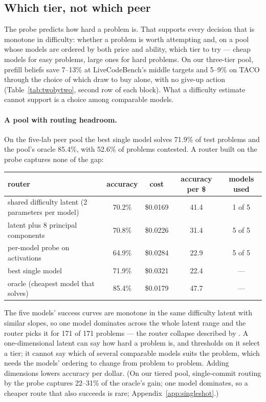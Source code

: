 \documentclass[10pt]{article} %
\begin{document}
\subsection{Which tier, not which peer}
\label{sec:whethernotwhich}

The probe predicts how hard a problem is.  That supports every decision that is monotone in
difficulty: whether a problem is worth attempting and, on a pool whose models are ordered by both
price and ability, which tier to try --- cheap models for easy problems, large ones for hard
problems.  On our three-tier pool, prefill beliefs save 7--13\% at LiveCodeBench's middle targets
and 5--9\% on TACO through the choice of which draw to buy alone, with no give-up action
(Table~\ref{tab:twobytwo}, second row of each block).  What a difficulty estimate cannot support
is a choice among comparable models.

\paragraph{A pool with routing headroom.}
On the five-lab peer pool the best single model solves 71.9\% of test problems and the pool's
oracle 85.4\%, with 52.6\% of problems contested.  A router built on the probe captures none of
the gap:
\begin{center}
\small
\begin{tabular}{lcccc}
\toprule
router & accuracy & cost & accuracy per \$ & models used \\
\midrule
shared difficulty latent (2 parameters per model) & 70.2\% & \$0.0169 & 41.4 & 1 of 5 \\
latent plus 8 principal components & 70.8\% & \$0.0226 & 31.4 & 5 of 5 \\
per-model probe on activations & 64.9\% & \$0.0284 & 22.9 & 5 of 5 \\
best single model & 71.9\% & \$0.0321 & 22.4 & --- \\
oracle (cheapest model that solves) & 85.4\% & \$0.0179 & 47.7 & --- \\
\bottomrule
\end{tabular}
\end{center}
The five models' success curves are monotone in the same difficulty latent with similar slopes,
so one model dominates across the whole latent range and the router picks it for 171 of 171
problems --- the router collapse described by \citet{routingcollapse2026}.  A one-dimensional
latent can say how hard a problem is, and thresholds on it select a tier; it cannot say which of
several comparable models suits the problem, which needs the models' ordering to change from
problem to problem.  Adding dimensions lowers accuracy per dollar.  (On our tiered pool,
single-commit routing by the probe captures 22--31\% of the oracle's gain; one model dominates,
so a cheaper route that also succeeds is rare; Appendix~\ref{app:singleshot}.)
\end{document}
